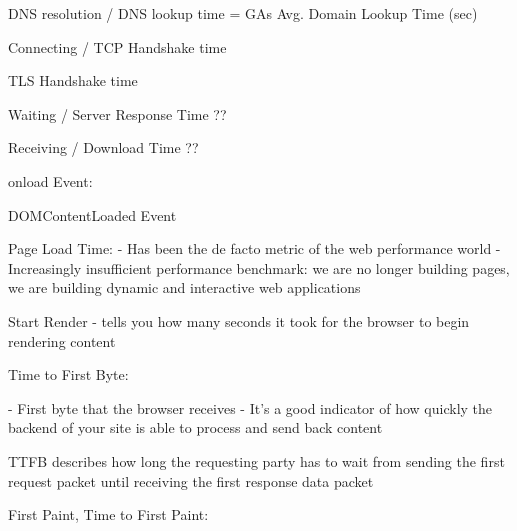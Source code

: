 DNS resolution / DNS lookup time %
= GAs Avg. Domain Lookup Time (sec) %


Connecting / TCP Handshake time %


TLS Handshake time %


Waiting / Server Response Time ?? %


Receiving / Download Time ?? %




onload Event: %


DOMContentLoaded Event %




Page Load Time: %
- Has been the de facto metric of the web performance world
- Increasingly insufficient performance benchmark: we are no longer building pages, we are building dynamic and interactive web applications




Start Render %
- tells you how many seconds it took for the browser to begin rendering content


Time to First Byte: %

- First byte that the browser receives
- It’s a good indicator of how quickly the backend of your site is able to process and send back content


TTFB describes how long the requesting party has to wait from sending the first request packet until receiving the first response data packet







First Paint, Time to First Paint: %


